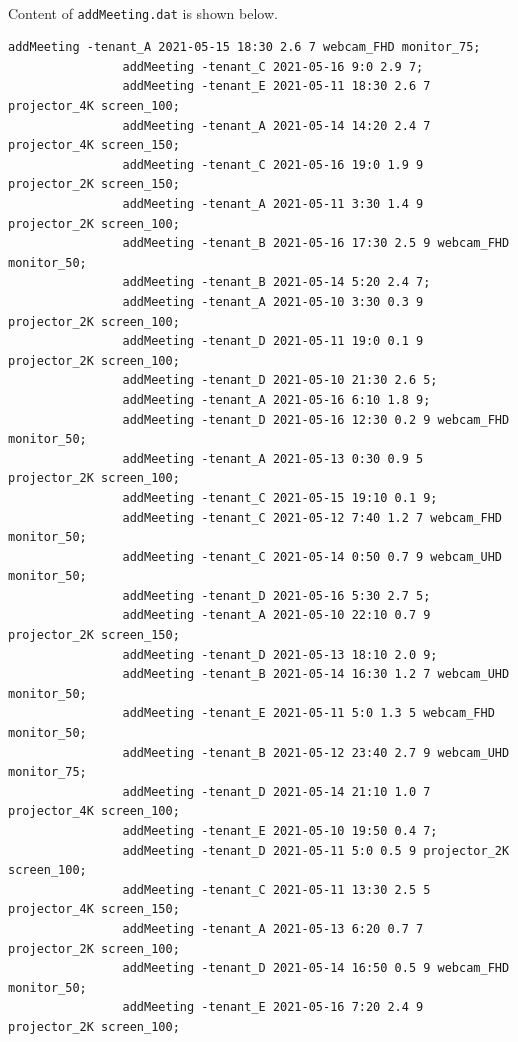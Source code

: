 \documentclass{article}
\begin{document}
            \paragraph{}
                Content of \texttt{addMeeting.dat} is shown below.
            \begin{Verbatim}[gobble=8]
                addMeeting -tenant_A 2021-05-15 18:30 2.6 7 webcam_FHD monitor_75;
                addMeeting -tenant_C 2021-05-16 9:0 2.9 7;
                addMeeting -tenant_E 2021-05-11 18:30 2.6 7 projector_4K screen_100;
                addMeeting -tenant_A 2021-05-14 14:20 2.4 7 projector_4K screen_150;
                addMeeting -tenant_C 2021-05-16 19:0 1.9 9 projector_2K screen_150;
                addMeeting -tenant_A 2021-05-11 3:30 1.4 9 projector_2K screen_100;
                addMeeting -tenant_B 2021-05-16 17:30 2.5 9 webcam_FHD monitor_50;
                addMeeting -tenant_B 2021-05-14 5:20 2.4 7;
                addMeeting -tenant_A 2021-05-10 3:30 0.3 9 projector_2K screen_100;
                addMeeting -tenant_D 2021-05-11 19:0 0.1 9 projector_2K screen_100;
                addMeeting -tenant_D 2021-05-10 21:30 2.6 5;
                addMeeting -tenant_A 2021-05-16 6:10 1.8 9;
                addMeeting -tenant_D 2021-05-16 12:30 0.2 9 webcam_FHD monitor_50;
                addMeeting -tenant_A 2021-05-13 0:30 0.9 5 projector_2K screen_100;
                addMeeting -tenant_C 2021-05-15 19:10 0.1 9;
                addMeeting -tenant_C 2021-05-12 7:40 1.2 7 webcam_FHD monitor_50;
                addMeeting -tenant_C 2021-05-14 0:50 0.7 9 webcam_UHD monitor_50;
                addMeeting -tenant_D 2021-05-16 5:30 2.7 5;
                addMeeting -tenant_A 2021-05-10 22:10 0.7 9 projector_2K screen_150;
                addMeeting -tenant_D 2021-05-13 18:10 2.0 9;
                addMeeting -tenant_B 2021-05-14 16:30 1.2 7 webcam_UHD monitor_50;
                addMeeting -tenant_E 2021-05-11 5:0 1.3 5 webcam_FHD monitor_50;
                addMeeting -tenant_B 2021-05-12 23:40 2.7 9 webcam_UHD monitor_75;
                addMeeting -tenant_D 2021-05-14 21:10 1.0 7 projector_4K screen_100;
                addMeeting -tenant_E 2021-05-10 19:50 0.4 7;
                addMeeting -tenant_D 2021-05-11 5:0 0.5 9 projector_2K screen_100;
                addMeeting -tenant_C 2021-05-11 13:30 2.5 5 projector_4K screen_150;
                addMeeting -tenant_A 2021-05-13 6:20 0.7 7 projector_2K screen_100;
                addMeeting -tenant_D 2021-05-14 16:50 0.5 9 webcam_FHD monitor_50;
                addMeeting -tenant_E 2021-05-16 7:20 2.4 9 projector_2K screen_100;

\end{Verbatim}
\end{document}
